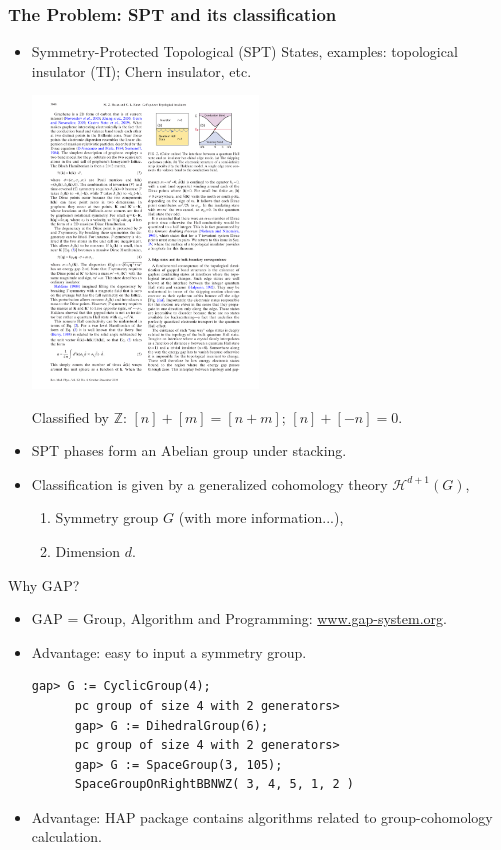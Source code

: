 \documentclass[xcolor=table, aspectratio=169]{beamer}
\begin{document}
\begin{frame}
	\frametitle{The Problem: SPT and its classification}
	\begin{itemize}
		\item Symmetry-Protected Topological (SPT) States, examples: topological insulator (TI); Chern insulator, etc.
		\begin{center}
			\includegraphics[width=6cm]{../spspt/qhe_edge}
		\end{center}
		{\small Classified by $\mathbb Z$: $[n]+[m]=[n+m]$; $[n]+[-n] = 0$.}	  
		\item SPT phases form an Abelian group under stacking.
		\item Classification is given by a generalized cohomology theory $\mathcal H^{d+1}(G)$,
		\begin{enumerate}
			\item Symmetry group $G$ (with more information...),
			\item Dimension $d$.
		\end{enumerate}
	\end{itemize}
\end{frame}

\begin{frame}[fragile]{Why GAP?}
  \begin{itemize}
  \item GAP = Group, Algorithm and Programming: \url{www.gap-system.org}.
  \item Advantage: easy to input a symmetry group.
    \begin{lstlisting}[basicstyle=\footnotesize]
      gap> G := CyclicGroup(4);
      pc group of size 4 with 2 generators>
      gap> G := DihedralGroup(6);
      pc group of size 4 with 2 generators>
      gap> G := SpaceGroup(3, 105);
      SpaceGroupOnRightBBNWZ( 3, 4, 5, 1, 2 )
    \end{lstlisting}
  \item Advantage: HAP package contains algorithms related to group-cohomology calculation.			
  \end{itemize}
\end{frame}
\end{document}
